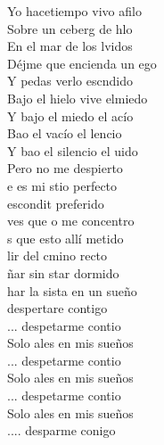 \begin{cancion}[Despertar][Estopa]
\jump
	  Yo hacetiempo vivo afilo\\
	  Sobre un ceberg de hlo\\
	    En el mar de los lvidos\\
	Déjme que encienda un ego\\
	Y pedas verlo escndido\\
	 Bajo el hielo vive elmiedo\\
	  Y bajo el miedo el acío\\
	Bao el vacío el lencio\\
	Y bao el silencio el uido\\
	    Pero no me despierto\\
\jump
	e es mi stio perfecto\\
	 escondit preferido\\
	 ves que o me concentro\\
	s que esto allí metido\\
	lir del cmino recto\\
	ñar sin star dormido\\
	har la sista en un sueño\\
	 despertare contigo\\
\jump
	... despetarme contio\\
	Solo ales en mis sueños\\
	... despetarme contio\\
	Solo ales en mis sueños\\
	... despetarme contio\\
	Solo ales en mis sueños\\
	.... desparme conigo\\
\jump
	         \\
\end{cancion}%
